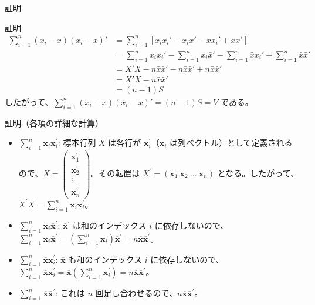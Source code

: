 \documentclass{beamer}
\begin{document}
\begin{frame}{証明}
\begin{block}{証明}
\[
\begin{aligned}
\sum_{i=1}^n (x_i - \bar{x})(x_i - \bar{x})'
&= \sum_{i=1}^n \left[ x_i x_i' - x_i \bar{x}' - \bar{x} x_i' + \bar{x} \bar{x}' \right] \\
&= \sum_{i=1}^n x_i x_i' - \sum_{i=1}^n x_i \bar{x}' - \sum_{i=1}^n \bar{x} x_i' + \sum_{i=1}^n \bar{x} \bar{x}' \\
&= X'X - n\bar{x} \bar{x}' - n\bar{x} \bar{x}' + n\bar{x} \bar{x}' \\
&= X'X - n\bar{x} \bar{x}' \\
&= (n-1)S
\end{aligned}
\]
したがって、$\sum_{i=1}^n (x_i - \bar{x})(x_i - \bar{x})' = (n-1)S = V$ である。
\end{block}
\end{frame}

\begin{frame}{証明（各項の詳細な計算）}
\begin{itemize}
    \item $\sum_{i=1}^{n}\bm{x}_{i}\bm{x}_{i}^{\prime}$: 標本行列 $X$ は各行が $\bm{x}_{i}^{\prime}$（$\bm{x}_{i}$ は列ベクトル）として定義されるので、$X=\begin{pmatrix}\bm{x}_{1}^{\prime}\\ \bm{x}_{2}^{\prime}\\ \vdots\\ \bm{x}_{n}^{\prime}\end{pmatrix}$。その転置は $X^{\prime}=(\bm{x}_{1}\ \bm{x}_{2}\ \dots\ \bm{x}_{n})$ となる。したがって、$X^{\prime}X=\sum_{i=1}^{n}\bm{x}_{i}\bm{x}_{i}^{\prime}$。
    \item $\sum_{i=1}^{n}\bm{x}_{i}\overline{\bm{x}}^{\prime}$: $\overline{\bm{x}}^{\prime}$ は和のインデックス $i$ に依存しないので、$\sum_{i=1}^{n}\bm{x}_{i}\overline{\bm{x}}^{\prime} = (\sum_{i=1}^{n}\bm{x}_{i})\overline{\bm{x}}^{\prime} = n\overline{\bm{x}}\overline{\bm{x}}^{\prime}$。
    \item $\sum_{i=1}^{n}\overline{\bm{x}}\bm{x}_{i}^{\prime}$: $\overline{\bm{x}}$ も和のインデックス $i$ に依存しないので、$\sum_{i=1}^{n}\overline{\bm{x}}\bm{x}_{i}^{\prime} = \overline{\bm{x}}(\sum_{i=1}^{n}\bm{x}_{i}^{\prime}) = n\overline{\bm{x}}\overline{\bm{x}}^{\prime}$。
    \item $\sum_{i=1}^{n}\overline{\bm{x}}\overline{\bm{x}}^{\prime}$: これは $n$ 回足し合わせるので、$n\overline{\bm{x}}\overline{\bm{x}}^{\prime}$。
\end{itemize}
\end{frame}
\end{document}
